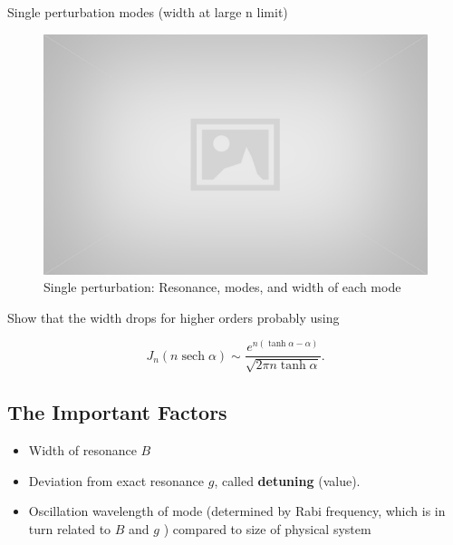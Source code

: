 \documentclass[%
preprint,
 amsmath,amssymb,
 aps,
]{revtex4-1}
\newcommand{\sech}[1]{{\operatorname{sech}{#1}}}
\begin{document}
Single perturbation modes (width at large n limit)

\begin{figure}[!htbp]
    \centering
    \includegraphics[width=\textwidth]{assets/placeholder.jpg}
    \caption{Single perturbation: Resonance, modes, and width of each mode}
    \label{fig:single-perturbation-modes}
\end{figure}


Show that the width drops for higher orders probably using

\begin{equation}
J_n(n \sech \alpha) \sim \frac{ e^{n(\tanh\alpha - \alpha)} }{\sqrt{ 2\pi n \tanh \alpha } }.
\end{equation}





    

\subsection{The Important Factors}



\begin{itemize}
            \item Width of resonance $B$
            \item Deviation from exact resonance $g$, called {\bf{detuning}} (value).
            \item Oscillation wavelength of mode (determined by Rabi frequency, which is in turn related to $B$ and $g$ ) compared to size of physical system
\end{itemize}
\end{document}
